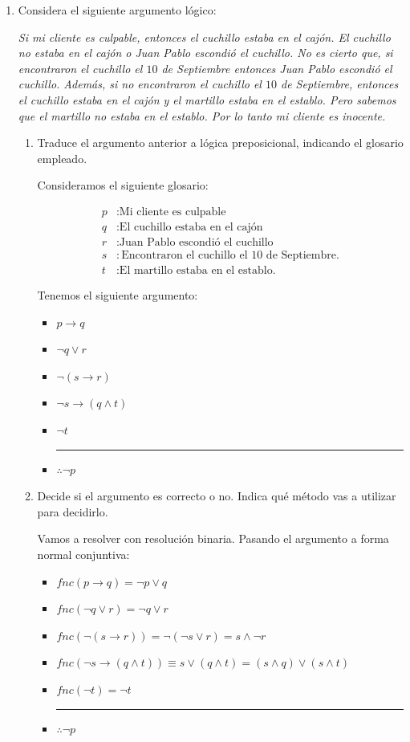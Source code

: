 \documentclass[11pt,letterpaper]{article}
\begin{document}
\begin{enumerate}
\item Considera el siguiente argumento lógico:
  
  {\it Si mi cliente es culpable, entonces el cuchillo estaba en el cajón. El
  cuchillo no estaba en el cajón o Juan Pablo escondió el cuchillo. No es
  cierto que, si encontraron el cuchillo el $10$ de Septiembre entonces
  Juan Pablo escondió el cuchillo. Además, si no encontraron el cuchillo el
  $10$ de Septiembre, entonces el cuchillo estaba en el cajón y el martillo
  estaba en el establo. Pero sabemos que el martillo no estaba en el
  establo. Por lo tanto mi cliente es inocente.}
  \begin{enumerate}
  \item Traduce el argumento anterior a lógica preposicional, indicando
    el glosario empleado.

    Consideramos el siguiente glosario:

    \begin{align*}
      p&:\text{Mi cliente es culpable}\\
      q&:\text{El cuchillo estaba en el cajón}\\
      r&:\text{Juan Pablo escondió el cuchillo}\\
      s&:\text{Encontraron el cuchillo el $10$ de Septiembre.}\\
      t&:\text{El martillo estaba en el establo.}
    \end{align*}

    Tenemos el siguiente argumento:
    \begin{itemize}
    \item[] $p\rightarrow q$
    \item[] $\neg q\lor r$
    \item[] $\neg(s\rightarrow r)$
    \item[] $\neg s\rightarrow (q\land t)$
    \item[] $\neg t$\\
      \rule{.3\textwidth}{0.2mm}
    \item[] $\therefore \neg p$
    \end{itemize}
  \item Decide si el argumento es correcto o no. Indica qué método
    vas a utilizar para decidirlo.

    Vamos a resolver con resolución binaria.
    Pasando el argumento a forma normal conjuntiva:
    \begin{itemize}
    \item[] $fnc(p\rightarrow q) = \neg p\lor q$
    \item[] $fnc(\neg q\lor r) = \neg q\lor r$
    \item[] $fnc(\neg(s\rightarrow r)) = \neg(\neg s\lor r) = s\land \neg r$
    \item[] $fnc(\neg s\rightarrow (q\land t)) \equiv s\lor (q\land t)
      = (s\land q) \lor (s\land t)$
    \item[] $fnc(\neg t) = \neg t$\\
      \rule{.3\textwidth}{0.2mm}
    \item[] $\therefore \neg p$
    \end{itemize}
  \end{enumerate}


\end{enumerate}
\end{document}
